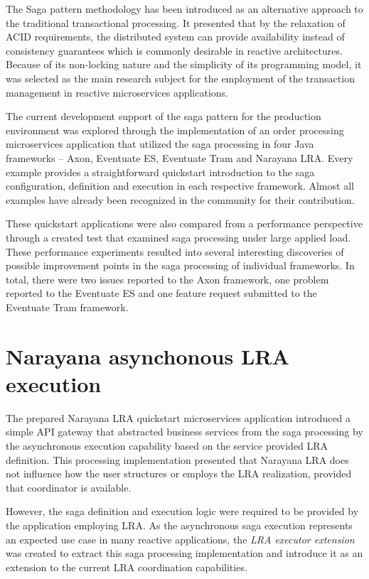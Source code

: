 \documentclass[oneside,
  digital, %
  table,   %
  lof,     %
  lot,     %
]{fithesis3}
\begin{document}
The Saga pattern \cite{sagas_publ} methodology has been introduced as an alternative approach to the traditional transactional processing. It presented that by the relaxation of ACID requirements, the distributed system can provide availability instead of consistency guarantees which is commonly desirable in reactive architectures. Because of its non-locking nature and the simplicity of its programming model, it was selected as the main research subject for the employment of the transaction management in reactive microservices applications.

The current development support of the saga pattern for the production environment was explored through the implementation of an order processing microservices application that utilized the saga processing in four Java frameworks -- Axon, Eventuate ES, Eventuate Tram and Narayana LRA. Every example provides a straightforward quickstart introduction to the saga configuration, definition and execution in each respective framework. Almost all examples have already been recognized in the community for their contribution.

These quickstart applications were also compared from a performance perspective through a created test that examined saga processing under large applied load. These performance experiments resulted into several interesting discoveries of possible improvement points in the saga processing of individual frameworks. In total, there were two issues reported to the Axon framework, one problem reported to the Eventuate ES and one feature request submitted to the Eventuate Tram framework.

\section{Narayana asynchonous LRA execution}

The prepared Narayana LRA quickstart microservices application introduced a simple API gateway that abstracted business services from the saga processing by the asynchronous execution capability based on the service provided LRA definition. This processing implementation presented that Narayana LRA does not influence how the user structures or employs the LRA realization, provided that coordinator is available.

However, the saga definition and execution logic were required to be provided by the application employing LRA. As the asynchronous saga execution represents an expected use case in many reactive applications, the \textit{LRA executor extension} was created to extract this saga processing implementation and introduce it as an extension to the current LRA coordination capabilities.
\end{document}
